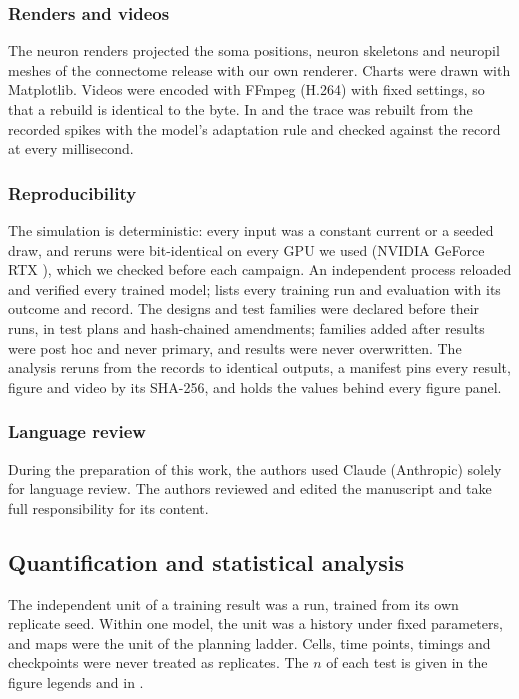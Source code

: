 \subsubsection{Renders and videos}

The neuron renders projected the soma positions, neuron skeletons and neuropil meshes of the connectome
release with our own renderer.
Charts were drawn with Matplotlib. Videos were encoded with FFmpeg (H.264) with fixed settings, so that a rebuild is identical
to the byte. In  and  the trace was rebuilt from the recorded spikes with the model's adaptation rule and checked
against the record at every millisecond.

\subsubsection{Reproducibility}

The simulation is deterministic: every input was a constant current or a seeded draw, and reruns were bit-identical on every
GPU we used (NVIDIA GeForce RTX ), which we checked before each campaign. An independent process reloaded and verified
every trained model;  lists every training run and evaluation with its outcome and record. The designs and test
families were declared before their runs, in test plans and hash-chained amendments; families added after results were post
hoc and never primary, and results were never overwritten. The analysis reruns from the records to identical outputs, a
manifest pins every result, figure and video by its SHA-256, and  holds the values behind every figure panel.

\subsubsection{Language review}

During the preparation of this work, the authors used Claude (Anthropic) solely for language review. The authors reviewed and edited the manuscript and take full responsibility for its content.

\subsection{Quantification and statistical analysis}

The independent unit of a training result was a run, trained from its own replicate seed. Within one model, the unit was a
history under fixed parameters, and maps were the unit of the planning ladder. Cells, time points, timings and checkpoints
were never treated as replicates. The $n$ of each test is given in the figure legends and in .

